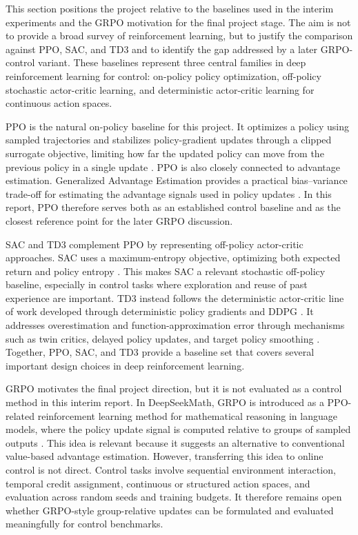 
\label{sec:related-work}

This section positions the project relative to the baselines used in the interim experiments and the GRPO motivation for the final project stage. The aim is not to provide a broad survey of reinforcement learning, but to justify the comparison against PPO, SAC, and TD3 and to identify the gap addressed by a later GRPO-control variant. These baselines represent three central families in deep reinforcement learning for control: on-policy policy optimization, off-policy stochastic actor-critic learning, and deterministic actor-critic learning for continuous action spaces.

PPO is the natural on-policy baseline for this project. It optimizes a policy using sampled trajectories and stabilizes policy-gradient updates through a clipped surrogate objective, limiting how far the updated policy can move from the previous policy in a single update \citep{schulman2017proximal}. PPO is also closely connected to advantage estimation. Generalized Advantage Estimation provides a practical bias--variance trade-off for estimating the advantage signals used in policy updates \citep{schulman2015gae}. In this report, PPO therefore serves both as an established control baseline and as the closest reference point for the later GRPO discussion.

SAC and TD3 complement PPO by representing off-policy actor-critic approaches. SAC uses a maximum-entropy objective, optimizing both expected return and policy entropy \citep{haarnoja2018sacapps}. This makes SAC a relevant stochastic off-policy baseline, especially in control tasks where exploration and reuse of past experience are important. TD3 instead follows the deterministic actor-critic line of work developed through deterministic policy gradients and DDPG \citep{silver2014deterministic,lillicrap2015continuous}. It addresses overestimation and function-approximation error through mechanisms such as twin critics, delayed policy updates, and target policy smoothing \citep{fujimoto2018td3}. Together, PPO, SAC, and TD3 provide a baseline set that covers several important design choices in deep reinforcement learning.

GRPO motivates the final project direction, but it is not evaluated as a control method in this interim report. In DeepSeekMath, GRPO is introduced as a PPO-related reinforcement learning method for mathematical reasoning in language models, where the policy update signal is computed relative to groups of sampled outputs \citep{shao2024deepseekmath}. This idea is relevant because it suggests an alternative to conventional value-based advantage estimation. However, transferring this idea to online control is not direct. Control tasks involve sequential environment interaction, temporal credit assignment, continuous or structured action spaces, and evaluation across random seeds and training budgets. It therefore remains open whether GRPO-style group-relative updates can be formulated and evaluated meaningfully for control benchmarks.

